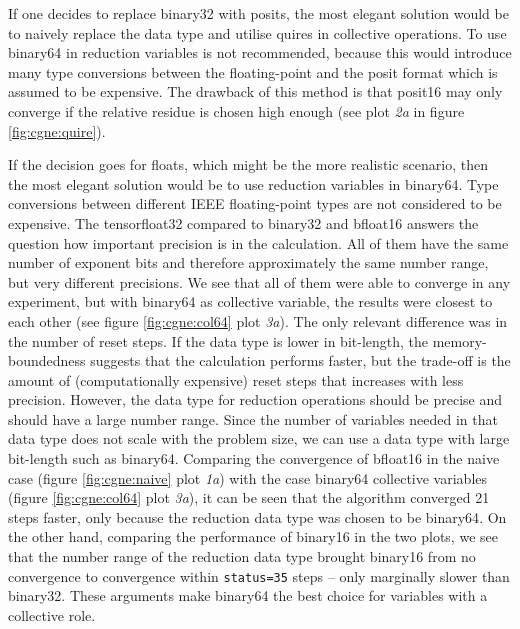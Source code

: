 \documentclass{article}
\theoremstyle{plain} %
\theoremstyle{convention} %
\theoremstyle{remark} %
\def\code#1{\texttt{#1}}
\numberwithin{equation}{section}
\begin{document}
If one decides to replace \gls{binary32} with posits, the most elegant solution would be to naively replace the data type and utilise \glspl{quire} in collective operations. To use \gls{binary64} in reduction variables is not recommended, because this would introduce many type conversions between the floating-point and the posit format which is assumed to be expensive. The drawback of this method is that \gls{posit16} may only converge if the relative residue is chosen high enough (see plot \textit{2a} in figure \ref{fig:cgne:quire}).

If the decision goes for floats, which might be the more realistic scenario, then the most elegant solution would be to use reduction variables in \gls{binary64}. Type conversions between different IEEE floating-point types are not considered to be expensive. The \gls{tensorfloat32} compared to \gls{binary32} and \gls{bfloat16} answers the question how important precision is in the calculation. All of them have the same number of exponent bits and therefore approximately the same number range, but very different precisions. We see that all of them were able to converge in any experiment, but with \gls{binary64} as collective variable, the results were closest to each other (see figure \ref{fig:cgne:col64} plot \textit{3a}). The only relevant difference was in the number of reset steps. If the data type is lower in bit-length, the memory-boundedness suggests that the calculation performs faster, but the trade-off is the amount of (computationally expensive) reset steps that increases with less precision. However, the data type for reduction operations should be precise and should have a large number range. Since the number of variables needed in that data type does not scale with the problem size, we can use a data type with large bit-length such as \gls{binary64}. Comparing the convergence of \gls{bfloat16} in the naive case (figure \ref{fig:cgne:naive} plot \textit{1a}) with the case \gls{binary64} collective variables (figure \ref{fig:cgne:col64} plot \textit{3a}), it can be seen that the algorithm converged \num{21} steps faster, only because the reduction data type was chosen to be \gls{binary64}. On the other hand, comparing the performance of \gls{binary16} in the two plots, we see that the number range of the reduction data type brought \gls{binary16} from no convergence to convergence within \code{status=35} steps -- only marginally slower than \gls{binary32}. These arguments make \gls{binary64} the best choice for variables with a collective role.
\end{document}
